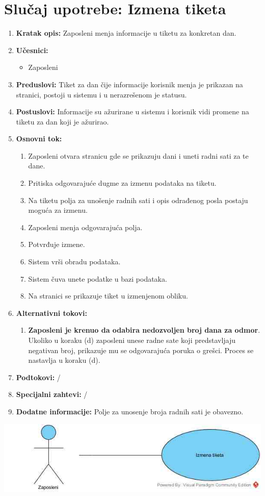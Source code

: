 \documentclass[a4paper]{article}
\begin{document}
\section{Slučaj upotrebe: Izmena tiketa}
\begin{enumerate}
    \item \textbf{Kratak opis:} Zaposleni menja informacije u tiketu za konkretan dan.
    \item \textbf{Učesnici:}
        \begin{itemize}
            \item Zaposleni
        \end{itemize}
    \item \textbf{Preduslovi:} Tiket za dan čije informacije korisnik menja je prikazan na stranici, postoji u sistemu i u nerazrešenom je statusu.
    \item \textbf{Postuslovi:} Informacije su ažurirane u sistemu i korisnik vidi promene na tiketu za dan koji je ažurirao.
    \item \textbf{Osnovni tok:}
        \begin{enumerate}
            \item Zaposleni otvara stranicu gde se prikazuju dani i uneti radni sati za te dane.
            \item Pritiska odgovarajuće dugme za izmenu podataka na tiketu.
            \item Na tiketu polja za unošenje radnih sati i opis odrađenog posla postaju moguća za izmenu.
            \item Zaposleni menja odgovarajuća polja.
            \item Potvrđuje izmene.
            \item Sistem vrši obradu podataka.
            \item Sistem čuva unete podatke u bazi podataka.
            \item Na stranici se prikazuje tiket u izmenjenom obliku.
        \end{enumerate}
    \item \textbf{Alternativni tokovi:}
        \begin{enumerate}
            \item \textbf{Zaposleni je krenuo da odabira nedozvoljen broj dana za odmor}. Ukoliko u koraku (d) zaposleni unese radne sate koji predstavljaju negativan broj, prikazuje mu se odgovarajuća poruka o grešci. Proces se nastavlja u koraku (d).
        \end{enumerate}
    \item \textbf{Podtokovi:} /
    \item \textbf{Specijalni zahtevi:} /
    \item \textbf{Dodatne informacije:} Polje za unosenje broja radnih sati je obavezno.
\end{enumerate}
\includegraphics[scale=0.5]{IzmenaTiketa.jpg}
\end{document}
